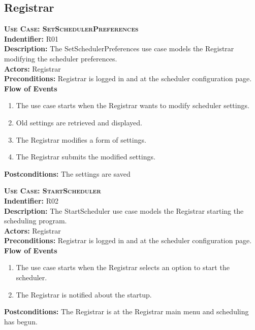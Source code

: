 \documentclass[11pt]{article}
\newcounter{id}
\newenvironment{usecase}{%
	\def\title##1{ {\large \bfseries  \scshape {Use Case:} ##1} \\ }
 	\def\id##1{{\bf Indentifier:} ##1\\}
	\def\des##1{ {\bf Description:} ##1\\}
	\def\actors##1{ {\bf Actors:} ##1\\}
    	\def\pre##1{ {\bf Preconditions:} ##1 \\} %
    	\def\flow##1{ {\bf Flow of Events} ##1}%
    	\newenvironment{ucenum}{%
        	\begin{enumerate}[nolistsep]\small}%
        	{\end{enumerate}}
	\def\post##1{ {\bf Postconditions:} ##1 \\}
}{\vspace{.05in}}
\begin{document}
\subsection{Registrar}
\begin{usecase}
  \title{SetSchedulerPreferences}
  \id{R01}
  \des{The SetSchedulerPreferences use case models the Registrar modifying the scheduler preferences.}
  \actors{Registrar}
  \pre{Registrar is logged in and at the scheduler configuration page.}
  \flow{}
  \begin{ucenum}
  \item The use case starts when the Registrar wants to modify scheduler settings.
  \item Old settings are retrieved and displayed.
  \item The Registrar modifies a form of settings.
  \item The Registrar submits the modified settings.
  \end{ucenum}
  \post{The settings are saved}
\end{usecase}

\begin{usecase}
  \title{StartScheduler}
  \id{R02}
  \des{The StartScheduler use case models the Registrar starting the scheduling program.}
  \actors{Registrar}
  \pre{Registrar is logged in and at the scheduler configuration page.}
  \flow{}
  \begin{ucenum}
  \item The use case starts when the Registrar selects an option to start the scheduler.
  \item The Registrar is notified about the startup.
  \end{ucenum}
  \post{The Registrar is at the Registrar main menu and scheduling has begun.}
\end{usecase}
\end{document}
